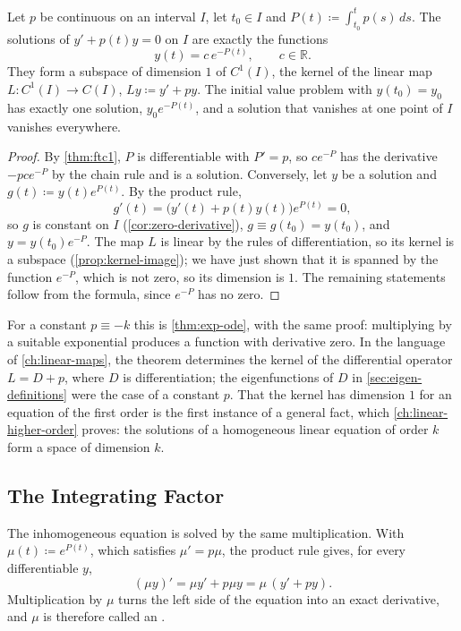 \begin{theorem}
\label{thm:linear-homogeneous}
Let $p$ be continuous on an interval $I$, let $t_0\in I$ and $P(t)\coloneqq\int_{t_0}^tp(s)\,ds$. The solutions of $y'+p(t)y=0$ on $I$ are exactly the functions
\[
y(t)=c\,e^{-P(t)},\qquad c\in\mathbb R .
\]
They form a subspace of dimension $1$ of $C^1(I)$, the kernel of the linear map $L\colon C^1(I)\to C(I)$, $Ly\coloneqq y'+py$. The initial value problem with $y(t_0)=y_0$ has exactly one solution, $y_0e^{-P(t)}$, and a solution that vanishes at one point of $I$ vanishes everywhere.
\end{theorem}

\begin{proof}
By \cref{thm:ftc1}, $P$ is differentiable with $P'=p$, so $ce^{-P}$ has the derivative $-pce^{-P}$ by the chain rule and is a solution. Conversely, let $y$ be a solution and $g(t)\coloneqq y(t)e^{P(t)}$. By the product rule,
\[
g'(t)=\bigl(y'(t)+p(t)y(t)\bigr)e^{P(t)}=0 ,
\]
so $g$ is constant on $I$ (\cref{cor:zero-derivative}), $g\equiv g(t_0)=y(t_0)$, and $y=y(t_0)e^{-P}$. The map $L$ is linear by the rules of differentiation, so its kernel is a subspace (\cref{prop:kernel-image}); we have just shown that it is spanned by the function $e^{-P}$, which is not zero, so its dimension is $1$. The remaining statements follow from the formula, since $e^{-P}$ has no zero.
\end{proof}

For a constant $p\equiv-k$ this is \cref{thm:exp-ode}, with the same proof: multiplying by a suitable exponential produces a function with derivative zero. In the language of \cref{ch:linear-maps}, the theorem determines the kernel of the differential operator $L=D+p$, where $D$ is differentiation; the eigenfunctions of $D$ in \cref{sec:eigen-definitions} were the case of a constant $p$. That the kernel has dimension $1$ for an equation of the first order is the first instance of a general fact, which \cref{ch:linear-higher-order} proves: the solutions of a homogeneous linear equation of order $k$ form a space of dimension $k$.

\subsection{The Integrating Factor}

The inhomogeneous equation is solved by the same multiplication. With $\mu(t)\coloneqq e^{P(t)}$, which satisfies $\mu'=p\mu$, the product rule gives, for every differentiable $y$,
\begin{equation}
(\mu y)'=\mu y'+p\mu y=\mu\,(y'+py).
\label{eq:integrating-factor}
\end{equation}
Multiplication by $\mu$ turns the left side of the equation into an exact derivative, and $\mu$ is therefore called an .

